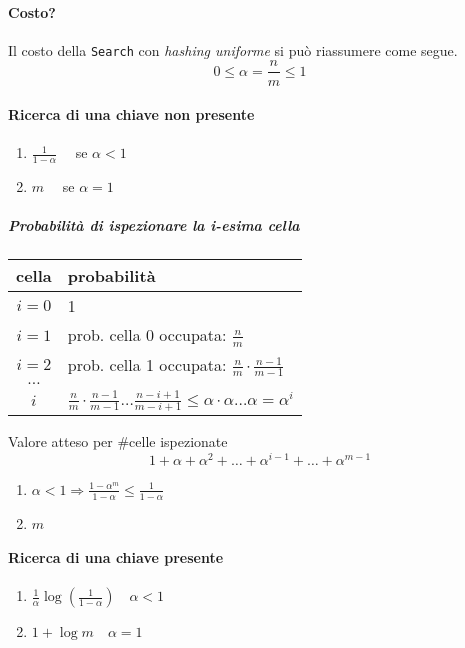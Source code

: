 \paragraph{Costo?}
Il costo della \texttt{Search} con \emph{hashing uniforme} si può riassumere come segue.
$$0 \leq \alpha = \frac{n}{m} \leq 1$$

\paragraph{Ricerca di una chiave non presente}
\begin{enumerate}[label=(\alph*)]
    \item $\frac{1}{1-\alpha} \quad$ se $\alpha < 1$
    \item $m \quad$ se $\alpha = 1$ 
\end{enumerate}

\subparagraph{Probabilità di ispezionare la i-esima cella}
\begin{center}
    \begin{tabular}{c|l}
        \textbf{cella} & \textbf{probabilità} \\
        \hline
        $i = 0$ & 1 \\
        $i = 1$ & prob. cella 0 occupata: $\frac{n}{m}$ \\
        $i = 2$ & prob. cella 1 occupata: $\frac{n}{m} \cdot \frac{n-1}{m-1}$ \\
        $\dots$ \\
        $i$ & $\frac{n}{m} \cdot \frac{n-1}{m-1} \dots \frac{n-i+1}{m-i+1} \leq \alpha \cdot \alpha \dots \alpha = \alpha^i$
    \end{tabular}
\end{center}

Valore atteso per \#celle ispezionate
$$1 + \alpha + \alpha^2 + \dots + \alpha^{i-1} + \dots + \alpha^{m-1}$$

\begin{enumerate}[label=(\alph*)]
    \item $\alpha < 1 \Rightarrow \frac{1 - \alpha^m}{1 - \alpha} \leq \frac{1}{1-\alpha}$ 
    \item $m$ 
\end{enumerate}

\paragraph{Ricerca di una chiave presente}
\begin{enumerate}[label=(\alph*)]
    \item $\frac{1}{\alpha} \log \left( \frac{1}{1-\alpha} \right) \quad \alpha < 1$
    \item $1 + \log m \quad \alpha = 1$
\end{enumerate}


